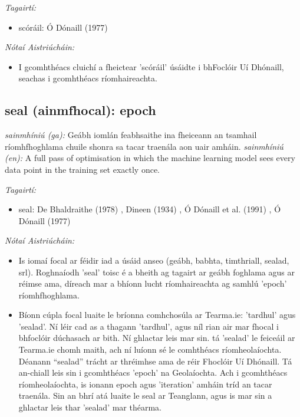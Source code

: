 \documentclass{article}
\begin{document}
 \noindent \textit{Tagairtí:}
\begin{itemize}
	\item scóráil: Ó Dónaill (1977) \cite{odonaill}
\end{itemize}

 \noindent \textit{Nótaí Aistriúcháin:}
\begin{itemize}
	\item I gcomhthéacs cluichí a fheictear 'scóráil' úsáidte i bhFoclóir Uí Dhónaill, seachas i gcomhthéacs ríomhaireachta.
\end{itemize}


\subsection*{seal (ainmfhocal): epoch} 
 \noindent \textit{sainmhíniú (ga):}  Geábh iomlán feabhsaithe ina fheiceann an tsamhail ríomhfhoghlama chuile shonra sa tacar traenála aon uair amháin.
\newline\newline
 \noindent \textit{sainmhíniú (en):} A full pass of optimisation in which the machine learning model sees every data point in the training set exactly once.
\newline

 \noindent \textit{Tagairtí:}
\begin{itemize}
	\item seal: De Bhaldraithe (1978) \cite{de-bhaldraithe}, Dineen (1934) \cite{dineen}, Ó Dónaill et al. (1991) \cite{focloir-beag}, Ó Dónaill (1977) \cite{odonaill}
\end{itemize}

 \noindent \textit{Nótaí Aistriúcháin:}
\begin{itemize}
	\item Is iomaí focal ar féidir iad a úsáid anseo (geábh, babhta, timthriall, sealad, srl). Roghnaíodh 'seal' toisc é a bheith ag tagairt ar geábh foghlama agus ar réimse ama, díreach mar a bhíonn lucht ríomhaireachta ag samhlú 'epoch' ríomhfhoghlama.
	\item Bíonn cúpla focal luaite le bríonna comhchosúla ar Tearma.ie: 'tardhul' agus 'sealad'. Ní léir cad as a thagann 'tardhul', agus níl rian air mar fhocal i bhfoclóir dúchasach ar bith. Ní ghlactar leis mar sin. tá 'sealad' le feiceáil ar Tearma.ie chomh maith, ach ní luíonn sé le comhthéacs ríomheolaíochta. Déanann “sealad” trácht ar thréimhse ama de réir Fhoclóir Uí Dhónaill. Tá an-chiall leis sin i gcomhthéacs 'epoch' na Geolaíochta. Ach i gcomhthéacs ríomheolaíochta, is ionann epoch agus 'iteration' amháin tríd an tacar traenála. Sin an bhrí atá luaite le seal ar Teanglann, agus is mar sin a ghlactar leis thar 'sealad' mar théarma.
\end{itemize}
\end{document}
